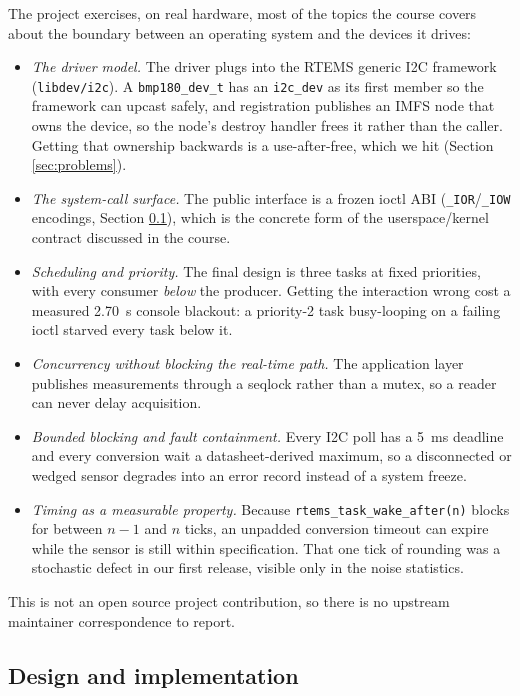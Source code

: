 \documentclass[10pt,a4]{article}
\begin{document}
The project exercises, on real hardware, most of the topics the course covers
about the boundary between an operating system and the devices it drives:

\begin{itemize}
\item \emph{The driver model.} The driver plugs into the RTEMS generic I2C
  framework (\texttt{libdev/i2c}). A \texttt{bmp180\_dev\_t} has an
  \texttt{i2c\_dev} as its first member so the framework can upcast safely, and
  registration publishes an IMFS node that owns the device, so the node's
  destroy handler frees it rather than the caller. Getting that ownership
  backwards is a use-after-free, which we hit (Section \ref{sec:problems}).
\item \emph{The system-call surface.} The public interface is a frozen ioctl
  ABI (\texttt{\_IOR}/\texttt{\_IOW} encodings, Section
  \ref{sec:design}), which is the concrete form of the userspace/kernel contract
  discussed in the course.
\item \emph{Scheduling and priority.} The final design is three tasks at fixed
  priorities, with every consumer \emph{below} the producer. Getting the
  interaction wrong cost a measured 2.70~s console blackout: a priority-2 task
  busy-looping on a failing ioctl starved every task below it.
\item \emph{Concurrency without blocking the real-time path.} The application
  layer publishes measurements through a seqlock rather than a mutex, so a
  reader can never delay acquisition.
\item \emph{Bounded blocking and fault containment.} Every I2C poll has a 5~ms
  deadline and every conversion wait a datasheet-derived maximum, so a
  disconnected or wedged sensor degrades into an error record instead of a
  system freeze.
\item \emph{Timing as a measurable property.} Because
  \texttt{rtems\_task\_wake\_after(n)} blocks for between $n-1$ and $n$ ticks,
  an unpadded conversion timeout can expire while the sensor is still within
  specification. That one tick of rounding was a stochastic defect in our first
  release, visible only in the noise statistics.
\end{itemize}

This is not an open source project contribution, so there is no upstream
maintainer correspondence to report.

\subsection{Design and implementation}
\label{sec:design}
\end{document}

